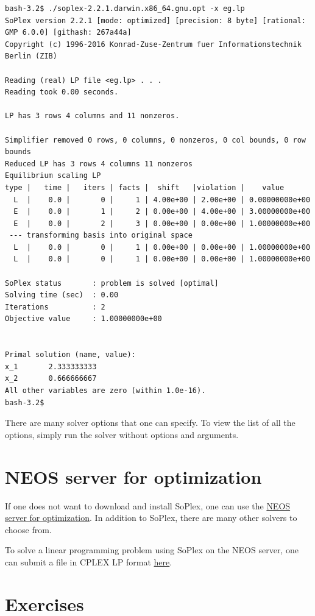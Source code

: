 \documentclass[]{book}
\theoremstyle{definition}
\theoremstyle{definition}
\theoremstyle{remark}
\begin{document}
{\footnotesize
\begin{verbatim}
bash-3.2$ ./soplex-2.2.1.darwin.x86_64.gnu.opt -x eg.lp
SoPlex version 2.2.1 [mode: optimized] [precision: 8 byte] [rational: GMP 6.0.0] [githash: 267a44a]
Copyright (c) 1996-2016 Konrad-Zuse-Zentrum fuer Informationstechnik Berlin (ZIB)

Reading (real) LP file <eg.lp> . . .
Reading took 0.00 seconds.

LP has 3 rows 4 columns and 11 nonzeros.

Simplifier removed 0 rows, 0 columns, 0 nonzeros, 0 col bounds, 0 row bounds
Reduced LP has 3 rows 4 columns 11 nonzeros
Equilibrium scaling LP
type |   time |   iters | facts |  shift   |violation |    value
  L  |    0.0 |       0 |     1 | 4.00e+00 | 2.00e+00 | 0.00000000e+00
  E  |    0.0 |       1 |     2 | 0.00e+00 | 4.00e+00 | 3.00000000e+00
  E  |    0.0 |       2 |     3 | 0.00e+00 | 0.00e+00 | 1.00000000e+00
 --- transforming basis into original space
  L  |    0.0 |       0 |     1 | 0.00e+00 | 0.00e+00 | 1.00000000e+00
  L  |    0.0 |       0 |     1 | 0.00e+00 | 0.00e+00 | 1.00000000e+00

SoPlex status       : problem is solved [optimal]
Solving time (sec)  : 0.00
Iterations          : 2
Objective value     : 1.00000000e+00


Primal solution (name, value):
x_1       2.333333333
x_2       0.666666667
All other variables are zero (within 1.0e-16).
bash-3.2$ 
\end{verbatim}
}

There are many solver options that one can specify. To view the list of
all the options, simply run the solver without options and arguments.

\section{NEOS server for
optimization}\label{neos-server-for-optimization}

If one does not want to download and install SoPlex, one can use the
\href{https://neos-server.org/neos/solvers/index.html}{NEOS server for
optimization}. In addition to SoPlex, there are many other solvers to
choose from.

To solve a linear programming problem using SoPlex on the NEOS server,
one can submit a file in CPLEX LP format
\href{https://neos-server.org/neos/solvers/lp:SoPlex80bit/LP.html}{here}.

\section*{Exercises}\label{exercises-9}
\end{document}
